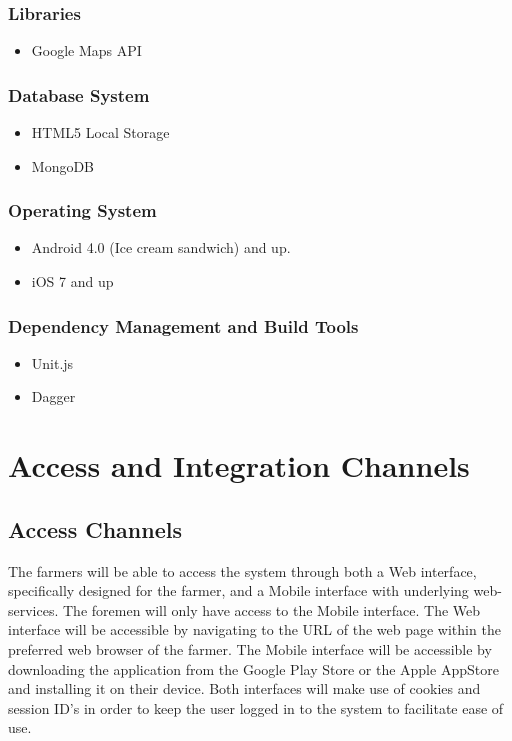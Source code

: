 \documentclass[11pt,fleqn]{book} %
\begin{document}
	\subsection{Libraries}
	\begin{itemize}
		\item Google Maps API
	\end{itemize}			
	\subsection{Database System}
	\begin{itemize}
		\item HTML5 Local Storage
		\item MongoDB
	\end{itemize}
	\subsection{Operating System}
	\begin{itemize}
		\item Android 4.0 (Ice cream sandwich) and up.
		\item iOS 7 and up
	\end{itemize}
	\subsection{Dependency Management and Build Tools}
	\begin{itemize}
		\item Unit.js
		\item Dagger
	\end{itemize}
	
	
	
	
	\chapter{Access and Integration Channels}
	
	\section{Access Channels}
	
	The farmers will be able to access the system through both a Web interface, specifically designed for the farmer, and a Mobile interface with underlying web-services. The foremen will only have access to the Mobile interface. The Web interface will be accessible by navigating to the URL of the web page within the preferred web browser of the farmer. The Mobile interface will be accessible by downloading the application from the Google Play Store or the Apple AppStore and installing it on their device. Both interfaces will make use of cookies and session ID’s in order to keep the user logged in to the system to facilitate ease of use.
	
\end{document}
